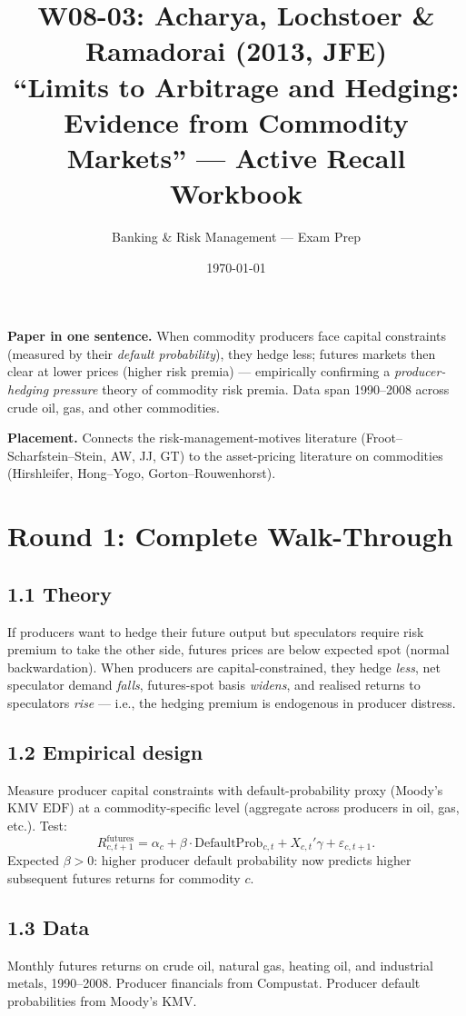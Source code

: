 \documentclass[11pt]{article}
\title{W08-03: Acharya, Lochstoer \& Ramadorai (2013, JFE) \\
\large ``Limits to Arbitrage and Hedging: Evidence from Commodity Markets'' --- Active Recall Workbook}
\author{Banking \& Risk Management --- Exam Prep}
\date{\today}
\begin{document}
\maketitle

\begin{keybox}
\textbf{Paper in one sentence.} When commodity producers face capital constraints (measured by their \emph{default probability}), they hedge less; futures markets then clear at lower prices (higher risk premia) --- empirically confirming a \emph{producer-hedging pressure} theory of commodity risk premia. Data span 1990--2008 across crude oil, gas, and other commodities.

\textbf{Placement.} Connects the risk-management-motives literature (Froot--Scharfstein--Stein, AW, JJ, GT) to the asset-pricing literature on commodities (Hirshleifer, Hong--Yogo, Gorton--Rouwenhorst).
\end{keybox}

\section*{Round 1: Complete Walk-Through}

\subsection*{1.1 Theory}
If producers want to hedge their future output but speculators require risk premium to take the other side, futures prices are below expected spot (normal backwardation). When producers are capital-constrained, they hedge \emph{less}, net speculator demand \emph{falls}, futures-spot basis \emph{widens}, and realised returns to speculators \emph{rise} --- i.e., the hedging premium is endogenous in producer distress.

\subsection*{1.2 Empirical design}
Measure producer capital constraints with default-probability proxy (Moody's KMV $\text{EDF}$) at a commodity-specific level (aggregate across producers in oil, gas, etc.). Test:
\[
R^{\text{futures}}_{c,t+1}=\alpha_c + \beta\cdot \text{DefaultProb}_{c,t}+X_{c,t}'\gamma+\varepsilon_{c,t+1}.
\]
Expected $\beta>0$: higher producer default probability now predicts higher subsequent futures returns for commodity $c$.

\subsection*{1.3 Data}
Monthly futures returns on crude oil, natural gas, heating oil, and industrial metals, 1990--2008. Producer financials from Compustat. Producer default probabilities from Moody's KMV.
\end{document}

